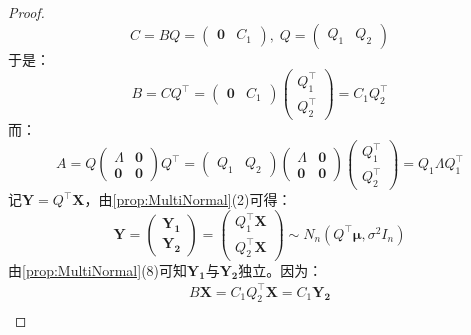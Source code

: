 \begin{proof}
	\begin{equation*}
		C=BQ=
		\begin{pmatrix}
			\mathbf{0} & C_1
		\end{pmatrix},\;
		Q=
		\begin{pmatrix}
			Q_1 & Q_2
		\end{pmatrix}
	\end{equation*}
	于是：
	\begin{equation*}
		B=CQ^{\top}=
		\begin{pmatrix}
			\mathbf{0} & C_1
		\end{pmatrix}
		\begin{pmatrix}
			Q_1^{\top} \\
			Q_2^{\top}
		\end{pmatrix}
		=C_1Q_2^{\top}
	\end{equation*}
	而：
	\begin{equation*}
		A=Q
		\begin{pmatrix}
			\varLambda & \mathbf{0} \\
			\mathbf{0} & \mathbf{0}
		\end{pmatrix}
		Q^{\top}
		=
		\begin{pmatrix}
			Q_1 & Q_2
		\end{pmatrix}
		\begin{pmatrix}
			\varLambda & \mathbf{0} \\
			\mathbf{0} & \mathbf{0}
		\end{pmatrix}
		\begin{pmatrix}
			Q_1^{\top} \\
			Q_2^{\top}
		\end{pmatrix}
		=Q_1\varLambda Q_1^{\top}
	\end{equation*}
	记$\mathbf{Y}=Q^{\top}\mathbf{X}$，由\cref{prop:MultiNormal}(2)可得：
	\begin{equation*}
		\mathbf{Y}=
		\begin{pmatrix}
			\mathbf{Y_1} \\
			\mathbf{Y_2}
		\end{pmatrix}
		=
		\begin{pmatrix}
			Q_1^{\top}\mathbf{X} \\
			Q_2^{\top}\mathbf{X}
		\end{pmatrix}
		\sim N_n(Q^{\top}\boldsymbol{\mu},\sigma^2I_n)
	\end{equation*}
	由\cref{prop:MultiNormal}(8)可知$\mathbf{Y_1}$与$\mathbf{Y_2}$独立。因为：
	\begin{gather*}
		B\mathbf{X}=C_1Q_2^{\top}\mathbf{X}=C_1\mathbf{Y_2} \\

\end{gather*}
\end{proof}
